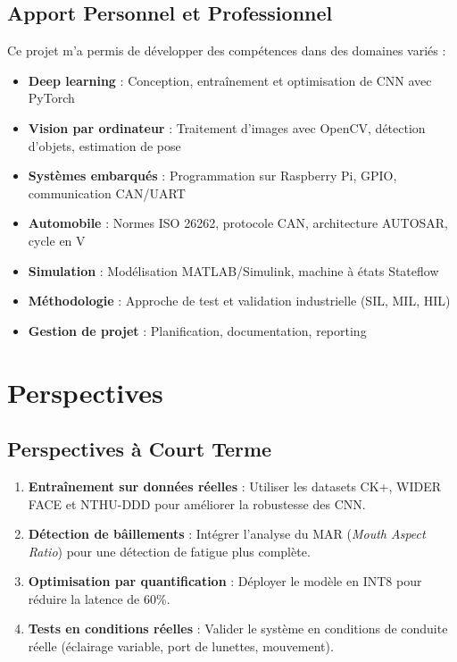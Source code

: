 \subsection{Apport Personnel et Professionnel}

Ce projet m'a permis de développer des compétences dans des domaines variés :

\begin{itemize}
    \item \textbf{Deep learning} : Conception, entraînement et optimisation de CNN avec PyTorch
    \item \textbf{Vision par ordinateur} : Traitement d'images avec OpenCV, détection d'objets, estimation de pose
    \item \textbf{Systèmes embarqués} : Programmation sur Raspberry Pi, GPIO, communication CAN/UART
    \item \textbf{Automobile} : Normes ISO 26262, protocole CAN, architecture AUTOSAR, cycle en V
    \item \textbf{Simulation} : Modélisation MATLAB/Simulink, machine à états Stateflow
    \item \textbf{Méthodologie} : Approche de test et validation industrielle (SIL, MIL, HIL)
    \item \textbf{Gestion de projet} : Planification, documentation, reporting
\end{itemize}

\section{Perspectives}

\subsection{Perspectives à Court Terme}

\begin{enumerate}[leftmargin=2cm]
    \item \textbf{Entraînement sur données réelles} : Utiliser les datasets CK+, WIDER FACE et NTHU-DDD pour améliorer la robustesse des CNN.
    \item \textbf{Détection de bâillements} : Intégrer l'analyse du MAR (\textit{Mouth Aspect Ratio}) pour une détection de fatigue plus complète.
    \item \textbf{Optimisation par quantification} : Déployer le modèle en INT8 pour réduire la latence de 60\%.
    \item \textbf{Tests en conditions réelles} : Valider le système en conditions de conduite réelle (éclairage variable, port de lunettes, mouvement).
\end{enumerate}

